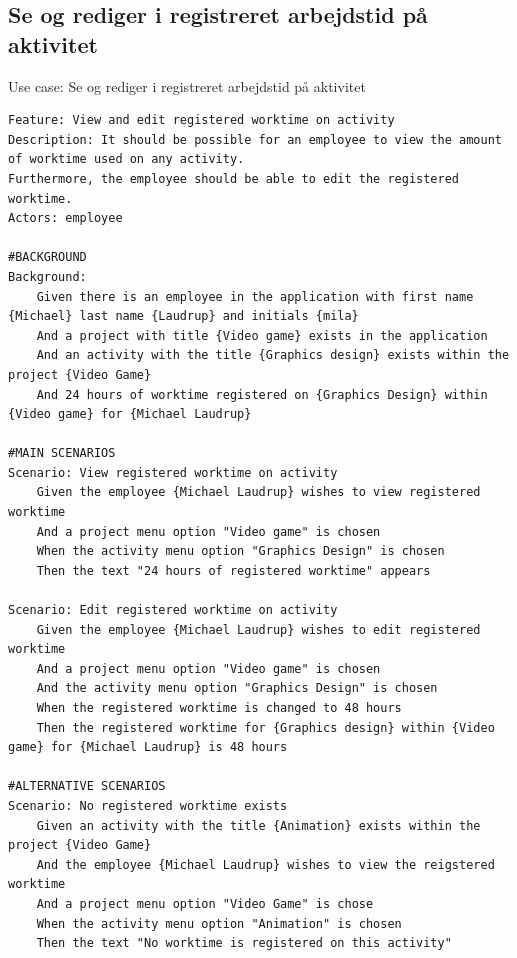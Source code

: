 \subsection{Se og rediger i registreret arbejdstid på aktivitet}
\begin{listing}[H]
    \centering
    \caption{Use case: Se og rediger i registreret arbejdstid på aktivitet}\label{lst:usecase_se_og_rediger_i_registreret_arbejdstid_paa_aktivitet}
    \begin{verbatim}  
Feature: View and edit registered worktime on activity
Description: It should be possible for an employee to view the amount of worktime used on any activity.
Furthermore, the employee should be able to edit the registered worktime. 
Actors: employee

#BACKGROUND
Background:
    Given there is an employee in the application with first name {Michael} last name {Laudrup} and initials {mila}
    And a project with title {Video game} exists in the application
    And an activity with the title {Graphics design} exists within the project {Video Game}
    And 24 hours of worktime registered on {Graphics Design} within {Video game} for {Michael Laudrup}

#MAIN SCENARIOS
Scenario: View registered worktime on activity
    Given the employee {Michael Laudrup} wishes to view registered worktime
    And a project menu option "Video game" is chosen
    When the activity menu option "Graphics Design" is chosen
    Then the text "24 hours of registered worktime" appears

Scenario: Edit registered worktime on activity
    Given the employee {Michael Laudrup} wishes to edit registered worktime
    And a project menu option "Video game" is chosen
    And the activity menu option "Graphics Design" is chosen
    When the registered worktime is changed to 48 hours
    Then the registered worktime for {Graphics design} within {Video game} for {Michael Laudrup} is 48 hours

#ALTERNATIVE SCENARIOS
Scenario: No registered worktime exists
    Given an activity with the title {Animation} exists within the project {Video Game}
    And the employee {Michael Laudrup} wishes to view the reigstered worktime
    And a project menu option "Video Game" is chose
    When the activity menu option "Animation" is chosen
    Then the text "No worktime is registered on this activity"

    \end{verbatim}
\end{listing}


